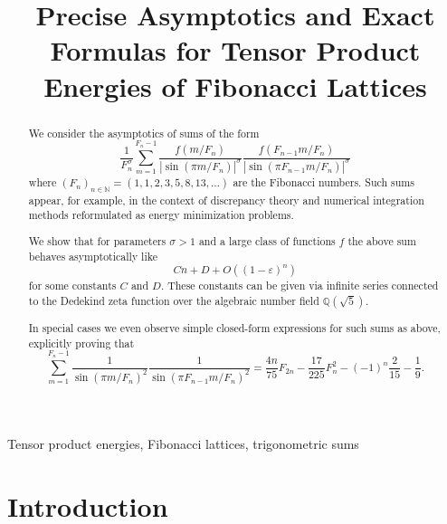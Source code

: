 \documentclass[]{interact}
\makeatletter
\newcommand{\monthyear}[1]{%
  \def\@monthyear{\uppercase{#1}}}
\newcommand{\volnumber}[1]{%
  \def\@volnumber{\uppercase{#1}}}
\newcommand{\bbN}{\mathbb{N}}
\newcommand{\bbQ}{\mathbb{Q}}
\theoremstyle{definition}
\numberwithin{table}{section} %
\numberwithin{figure}{section}
\makeatother
\begin{document}
\monthyear{Month Year}
\volnumber{Volume, Number}
\setcounter{page}{1}

\title{Precise Asymptotics and Exact Formulas for Tensor Product Energies of Fibonacci Lattices}

\author{
}

\maketitle

\begin{abstract}
	We consider the asymptotics of sums of the form
$$
\frac1{F_n^\sigma} \sum_{m = 1}^{F_n-1} \frac{f(m/F_n)}{\left|{\sin(\pi m/F_n)}\right|^\sigma} \frac{f(F_{n-1}m/F_n)}{\left|{\sin(\pi F_{n-1}m/F_n)}\right|^\sigma}
$$
where $(F_n)_{n \in \bbN} = (1, 1, 2, 3, 5, 8, 13, \dots)$ are the Fibonacci numbers. Such sums appear, for example, in the context of discrepancy theory and numerical integration methods reformulated as energy minimization problems.

We show that for parameters $\sigma > 1$ and a large class of functions $f$ the above sum behaves asymptotically like
$$
C n + D + O\left((1-\varepsilon)^{n}\right)
$$
for some constants $C$ and $D$. These constants can be given via infinite series connected to the Dedekind zeta function over the algebraic number field $\bbQ(\sqrt5)$.

In special cases we even observe simple closed-form expressions for such sums as above, explicitly proving that
$$
\sum_{m=1}^{F_n-1} \frac1{\sin(\pi m/F_n)^2} \frac1{\sin(\pi F_{n-1} m/F_n)^2} = \frac{4n}{75} F_{2n} - \frac{17}{225}F_n^2 - (-1)^n \frac2{15} - \frac19.
$$
\end{abstract}

\begin{keywords}
	Tensor product energies, Fibonacci lattices, trigonometric sums
\end{keywords}

\section{Introduction}
\end{document}
